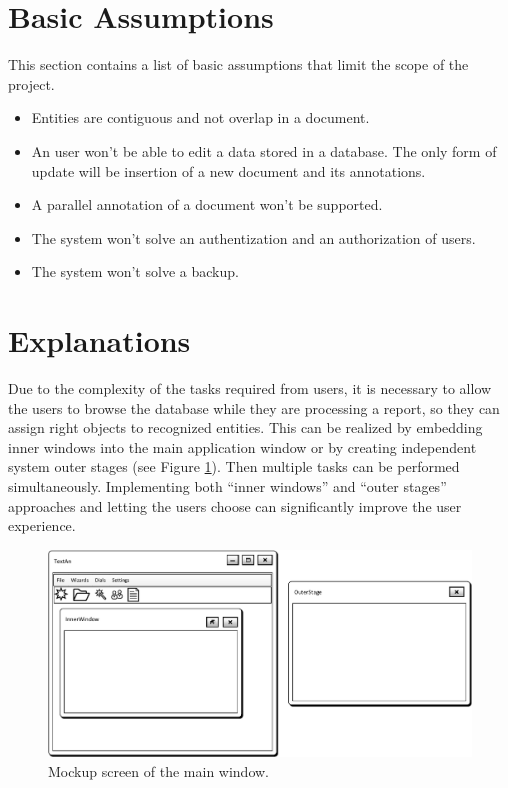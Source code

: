 \section{Basic Assumptions}

This section contains a list of basic assumptions that limit the scope of the
project.

\begin{itemize}
	\item Entities are contiguous and not overlap in a document.
	\item An user won't be able to edit a data stored in a database. The only form
	of update will be insertion of a new document and its annotations.
	\item A parallel annotation of a document won't be supported.
	\item The system won't solve an authentization and  an authorization of users.
	\item The system won't solve a backup.
\end{itemize}

\section{Explanations}


Due to the complexity of the tasks required from users, it is necessary to allow
the users to browse the database while they are processing a report, so they
can assign right objects to recognized entities. This can be realized by
embedding inner windows into the main application window or by creating
independent system outer stages (see Figure \ref{fig:MockupMainWindow}).
Then multiple tasks can be performed simultaneously. Implementing both
``inner windows'' and ``outer stages'' approaches and letting the users choose can
significantly improve the user experience.

\begin{figure}[!htb]
        \centering
        \includegraphics[width=\textwidth]{Images/MockupMainWindow}
        \caption{Mockup screen of the main window.}
        \label{fig:MockupMainWindow}
\end{figure}
